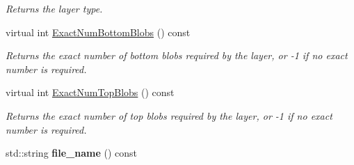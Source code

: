\begin{DoxyCompactItemize}
\begin{DoxyCompactList}\small\item\em Returns the layer type. \end{DoxyCompactList}\item 
virtual int \hyperlink{classcaffe_1_1HDF5OutputLayer_af874ff0bf8f1817f44d18398889bcbe4}{Exact\+Num\+Bottom\+Blobs} () const 
\begin{DoxyCompactList}\small\item\em Returns the exact number of bottom blobs required by the layer, or -\/1 if no exact number is required. \end{DoxyCompactList}\item 
virtual int \hyperlink{classcaffe_1_1HDF5OutputLayer_a2c754adb8c37b1299507865fdb616149}{Exact\+Num\+Top\+Blobs} () const 
\begin{DoxyCompactList}\small\item\em Returns the exact number of top blobs required by the layer, or -\/1 if no exact number is required. \end{DoxyCompactList}\item 
std\+::string {\bfseries file\+\_\+name} () const \hypertarget{classcaffe_1_1HDF5OutputLayer_aca8e3392384521de35e87618d3208571}{}\label{classcaffe_1_1HDF5OutputLayer_aca8e3392384521de35e87618d3208571}

\end{DoxyCompactItemize}
